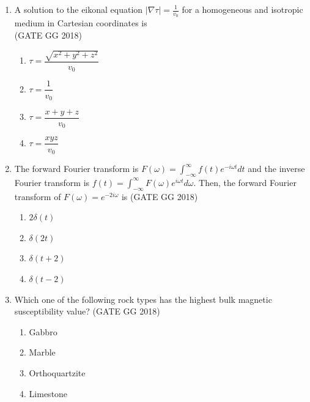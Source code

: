 \documentclass[journal]{IEEEtran}
\begin{document}
\begin{enumerate}[start=1]
\item A solution to the eikonal equation $|\nabla \tau| = \tfrac{1}{v_0}$ for a homogeneous and isotropic medium in Cartesian coordinates is\\
\hspace*{15.7cm}(GATE GG 2018)
\begin{multicols}{2}
\begin{enumerate}
\item $\tau = \dfrac{\sqrt{x^2+y^2+z^2}}{v_0}$
\item $\tau = \dfrac{1}{v_0}$
\item $\tau = \dfrac{x+y+z}{v_0}$
\item $\tau = \dfrac{xyz}{v_0}$
\end{enumerate}
\end{multicols}

\item The forward Fourier transform is $F(\omega) = \int_{-\infty}^{\infty} f(t) e^{-i\omega t} dt$  
and the inverse Fourier transform is $f(t) = \int_{-\infty}^{\infty}F(\omega)e^{i\omega t}d\omega$.  
Then, the forward Fourier transform of $F(\omega)=e^{-2i\omega}$ is
\hfill(GATE GG 2018)
\begin{multicols}{4}
\begin{enumerate}
\item $2\delta(t)$
\item $\delta(2t)$
\item $\delta(t+2)$
\item $\delta(t-2)$
\end{enumerate}
\end{multicols}

\item Which one of the following rock types has the highest bulk magnetic susceptibility value?
\hfill(GATE GG 2018)
\begin{enumerate}
\item Gabbro
\item Marble
\item Orthoquartzite
\item Limestone
\end{enumerate}


\end{enumerate}
\end{document}
